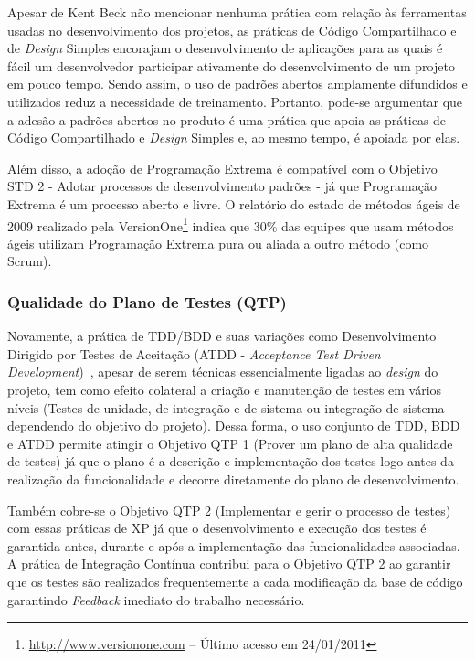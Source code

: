 Apesar de Kent Beck não mencionar nenhuma prática com relação às
ferramentas usadas no desenvolvimento dos projetos, as práticas de
Código Compartilhado e de \textit{Design} Simples encorajam o
desenvolvimento de aplicações para as quais é fácil um desenvolvedor
participar ativamente do desenvolvimento de um projeto em pouco
tempo. Sendo assim, o uso de padrões abertos amplamente difundidos e
utilizados reduz a necessidade de treinamento.  Portanto, pode-se
argumentar que a adesão a padrões abertos no produto é uma prática que
apoia as práticas de Código Compartilhado e \textit{Design} Simples e,
ao mesmo tempo, é apoiada por elas.

Além disso, a adoção de Programação Extrema é compatível com o
Objetivo STD 2 - Adotar processos de desenvolvimento padrões - já que
Programação Extrema é um processo aberto e livre. O relatório do
estado de métodos ágeis de 2009\cite{VersionOne2009} realizado pela
VersionOne\footnote{\url{http://www.versionone.com} -- Último acesso
  em 24/01/2011} indica que 30\% das equipes que usam métodos ágeis
utilizam Programação Extrema pura ou aliada a outro método (como
Scrum).

\subsubsection{Qualidade do Plano de Testes (QTP)}
\label{sec:+qtp}

Novamente, a prática de TDD/BDD e suas variações como Desenvolvimento
Dirigido por Testes de Aceitação (ATDD - \textit{Acceptance Test
  Driven Development})~\cite{Owen2004}, apesar de serem técnicas
essencialmente ligadas ao \textit{design} do projeto, tem como efeito
colateral a criação e manutenção de testes em vários níveis (Testes de
unidade, de integração e de sistema ou integração de sistema
dependendo do objetivo do projeto). Dessa forma, o uso conjunto de
TDD, BDD e ATDD permite atingir o Objetivo QTP 1 (Prover um plano de
alta qualidade de testes) já que o plano é a descrição e implementação
dos testes logo antes da realização da funcionalidade e decorre
diretamente do plano de desenvolvimento.

Também cobre-se o Objetivo QTP 2 (Implementar e gerir o processo de
testes) com essas práticas de XP já que o desenvolvimento e execução
dos testes é garantida antes, durante e após a implementação das
funcionalidades associadas. A prática de Integração Contínua contribui
para o Objetivo QTP 2 ao garantir que os testes são realizados
frequentemente a cada modificação da base de código garantindo
\textit{Feedback} imediato do trabalho necessário.

